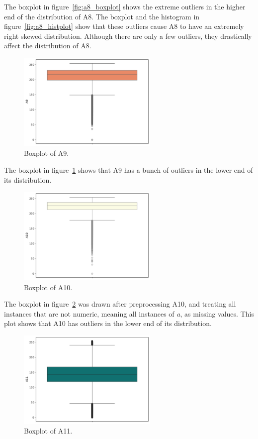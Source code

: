 \documentclass[11pt]{report}
\begin{document}
The boxplot in figure~\ref{fig:a8_boxplot} shows the extreme outliers in the higher end of the distribution of A8. The boxplot and the histogram in figure~\ref{fig:a8_histplot} show that these outliers cause A8 to have an extremely right skewed distribution. Although there are only a few outliers, they drastically affect the distribution of A8.

\begin{figure}[H]
    \centering
    \includegraphics[width=0.6\textwidth]{images/A9_boxplot.pdf}
    \caption{Boxplot of A9.}
    \label{fig:a9_boxplot}
\end{figure}

The boxplot in figure~\ref{fig:a9_boxplot} shows that A9 has a bunch of outliers in the lower end of its distribution.

\begin{figure}[H]
    \centering
    \includegraphics[width=0.6\textwidth]{images/A10_boxplot.pdf}
    \caption{Boxplot of A10.}
    \label{fig:a10_boxplot}
\end{figure}

The boxplot in figure~\ref{fig:a10_boxplot} was drawn after preprocessing A10, and treating all instances that are not numeric, meaning all instances of \textit{a}, as missing values. This plot shows that A10 has outliers in the lower end of its distribution.

\begin{figure}[H]
    \centering
    \includegraphics[width=0.6\textwidth]{images/A11_boxplot.pdf}
    \caption{Boxplot of A11.}
    \label{fig:a11_boxplot}
\end{figure}
\end{document}
